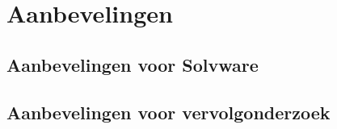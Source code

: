 \chapter{Aanbevelingen}

\section{Aanbevelingen voor Solvware}

\section{Aanbevelingen voor vervolgonderzoek}
